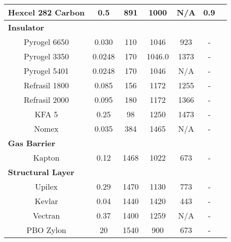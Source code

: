 \begin{table}[ht]
\begin{tabular}{|c|c|c|c|c|c|c|}
		Hexcel 282 Carbon & 0.5                                                   & 891                                        & 1000                                            & N/A 	 & 0.9  \\ \hline
		\multicolumn{6}{|l|}{\textbf{Insulator}}			\\ \hline
		Pyrogel\textsuperscript{\textregistered} 6650      & 0.030                                                 & 110                                        & 1046                                            & 923    & - \\ \hline
		Pyrogel\textsuperscript{\textregistered} 3350      & 0.0248                                                & 170                                        & 1046.0                                         & 1373  	 & - \\ \hline
		Pyrogel\textsuperscript{\textregistered} 5401      & 0.0248                                                & 170                                        & 1046                                            & N/A  	 & - \\ \hline
		Refrasil 1800      & 0.085                                                 & 156                                        & 1172                                            & 1255 	 & - \\ \hline
		Refrasil 2000      & 0.095                                                 & 180                                        & 1172                                            & 1366 	 & - \\ \hline
		KFA 5             & 0.25                                                  & 98                                         & 1250                                            & 1473 	 & - \\ \hline
		Nomex             & 0.035                                                  & 384                                         & 1465                                            & N/A 	 & - \\ \hline
		\multicolumn{6}{|l|}{\textbf{Gas Barrier}}			\\ \hline
		Kapton            & 0.12                                                  & 1468                                       & 1022                                            & 673	 & - \\ \hline
		\multicolumn{6}{|l|}{\textbf{Structural Layer}}			\\ \hline
		Upilex            & 0.29                                                  & 1470                                       & 1130                                            & 773 	 & - \\ \hline
		Kevlar            & 0.04 & 1440                                       & 1420                                            & 443 	 & - \\ \hline
		Vectran            & 0.37 & 1400 & 1259 & N/A 	 & -\\ \hline
		PBO Zylon\textsuperscript{\textregistered}			& 20			& 1540	& 900	& 673	& -\\ \hline
	\end{tabular}
	\label{tab:tpsmatprop2}
\end{table}